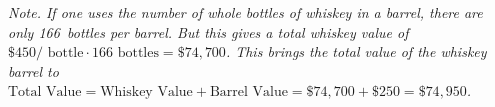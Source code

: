 \documentclass[11pt,letterpaper]{article}
\begin{document}
{\itshape Note. If one uses the number of whole bottles of whiskey in a barrel, there are only 166~bottles per barrel. But this gives a total whiskey value of $\$450/\text{ bottle} \cdot 166 \text{ bottles}= \$74,\!700$. This brings the total value of the whiskey barrel to $\text{Total Value}= \text{Whiskey Value} + \text{Barrel Value}= \$74,\!700 + \$250= \$74,\!950$.}
\end{document}
